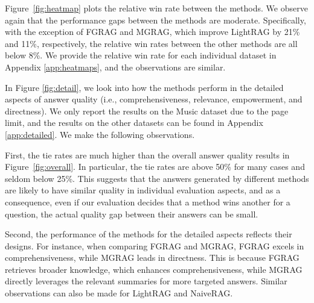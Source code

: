 Figure~\ref{fig:heatmap} plots the relative win rate between the methods. We observe again that the performance gaps between the methods are moderate. Specifically, with the exception of FGRAG and MGRAG, which improve LightRAG by 21\% and 11\%, respectively, the relative win rates between the other methods are all below 8\%. We provide the relative win rate for each individual dataset in Appendix \ref{app:heatmaps}, and the observations are similar. 















In Figure \ref{fig:detail}, we look into how the methods perform in the detailed aspects of answer quality (i.e., comprehensiveness, relevance, empowerment, and directness). We only report the results on the Music dataset due to the page limit, and the results on the other datasets can be found in Appendix \ref{app:detailed}. We make the following observations.

First, the tie rates are much higher than the overall answer quality results in Figure~\ref{fig:overall}. In particular, the tie rates are above 50\% for many cases and seldom below 25\%. This suggests that the answers generated by different methods are likely to have similar quality in individual evaluation aspects, and as a consequence, even if our evaluation decides that a method wins another for a question, the actual quality gap between their answers can be small.

Second, the performance of the methods for the detailed aspects reflects their designs. For instance, when comparing FGRAG and MGRAG, FGRAG excels in comprehensiveness, while MGRAG leads in directness. This is because FGRAG retrieves broader knowledge, which enhances comprehensiveness, while MGRAG directly leverages the relevant summaries for more targeted answers. Similar observations can also be made for LightRAG and NaiveRAG.

